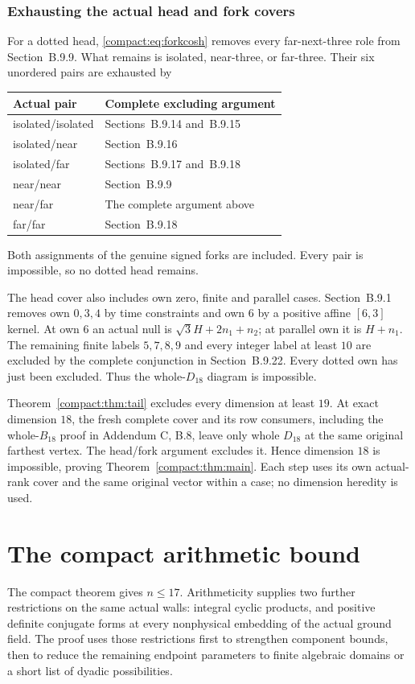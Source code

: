 \documentclass[11pt]{article}
\theoremstyle{remark}\newtheorem{remark}[theorem]{Remark}
\numberwithin{equation}{section}
\begin{document}
\subsubsection{Exhausting the actual head and fork covers}
For a dotted head, \eqref{compact:eq:forkcosh} removes every
far-next-three role from Section~B.9.9.
What remains is isolated, near-three, or far-three.
Their six unordered pairs are exhausted by
\begin{center}\small
\begin{tabular}{ll}
\toprule
Actual pair&Complete excluding argument\\ \midrule
isolated/isolated&Sections~B.9.14 and~B.9.15\\
isolated/near&Section~B.9.16\\
isolated/far&Sections~B.9.17 and~B.9.18\\
near/near&Section~B.9.9\\
near/far&The complete argument above\\
far/far&Section~B.9.18\\ \bottomrule
\end{tabular}
\end{center}
Both assignments of the genuine signed forks are included.
Every pair is impossible, so no dotted head remains.

The head cover also includes own zero, finite and parallel
cases. Section~B.9.1 removes own
 \(0,3,4\) by time constraints and own \(6\) by a positive
affine \([6,3]\) kernel. At own \(6\) an actual null is
 \(\sqrt3H+2n_1+n_2\); at parallel own it is \(H+n_1\).
The remaining finite labels \(5,7,8,9\) and every integer
label at least \(10\) are excluded by the complete conjunction in
Section~B.9.22. Every dotted own has just been excluded.
Thus the whole-\(D_{18}\) diagram is impossible.

Theorem~\ref{compact:thm:tail} excludes every dimension at least \(19\).
At exact dimension \(18\), the fresh complete cover and its
row consumers, including the whole-$B_{18}$ proof in Addendum C, B.8, leave only
whole \(D_{18}\) at the same original farthest vertex.
The head/fork argument excludes it. Hence dimension \(18\)
is impossible, proving Theorem~\ref{compact:thm:main}. Each step uses its
own actual-rank cover and the same original vector within a case;
no dimension heredity is used.


\section{The compact arithmetic bound}\label{sec:arithmetic}
The compact theorem gives $n\le17$. Arithmeticity supplies two further
restrictions on the same actual walls: integral cyclic products, and
positive definite conjugate forms at every nonphysical embedding of the
actual ground field. The proof uses those restrictions first to strengthen
component bounds, then to reduce the remaining endpoint parameters to
finite algebraic domains or a short list of dyadic possibilities.
\end{document}
